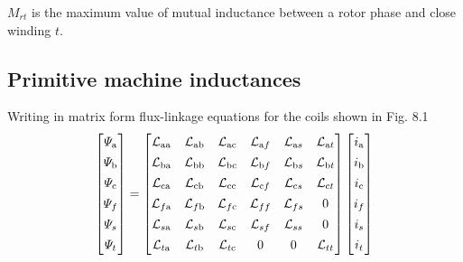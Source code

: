 \documentclass[a4paper,numbers=noenddot,12pt]{scrbook}
\begin{document}
$M_{rt}$ is the maximum value of mutual inductance between a rotor phase and close winding $t$.

\subsection{Primitive machine inductances} Writing in matrix form flux-linkage equations for the coils shown in Fig. 8.1
\begin{equation}
    \begin{bmatrix}
        \varPsi_{\textup{a}} \\[1ex] \varPsi_{\textup{b}} \\[1ex] \varPsi_{\textup{c}} \\[1ex] \varPsi_{f} \\[1ex] \varPsi_{s} \\[1ex] \varPsi_{t}
    \end{bmatrix}
    =
    \begin{bmatrix}

        \mathcal{L}_{\textup{aa}} & \mathcal{L}_{\textup{ab}} & \mathcal{L}_{\textup{ac}} & \mathcal{L}_{\textup{a}f} & \mathcal{L}_{\textup{a}s} & \mathcal{L}_{\textup{a}t} \\[1ex]  
        \mathcal{L}_{\textup{ba}} & \mathcal{L}_{\textup{bb}} & \mathcal{L}_{\textup{bc}} & \mathcal{L}_{\textup{b}f} & \mathcal{L}_{\textup{b}s} & \mathcal{L}_{\textup{b}t} \\[1ex]
        \mathcal{L}_{\textup{ca}} & \mathcal{L}_{\textup{cb}} & \mathcal{L}_{\textup{cc}} & \mathcal{L}_{\textup{c}f} & \mathcal{L}_{\textup{c}s} & \mathcal{L}_{\textup{c}t} \\[1ex]  
        \mathcal{L}_{f\textup{a}} & \mathcal{L}_{f\textup{b}} & \mathcal{L}_{f\textup{c}} & \mathcal{L}_{ff} & \mathcal{L}_{fs} & 0 \\[1ex]  
        \mathcal{L}_{s\textup{a}} & \mathcal{L}_{s\textup{b}} & \mathcal{L}_{s\textup{c}} & \mathcal{L}_{sf} & \mathcal{L}_{ss} & 0 \\[1ex]  
        \mathcal{L}_{t\textup{a}} & \mathcal{L}_{t\textup{b}} & \mathcal{L}_{t\textup{c}} & 0 & 0 & \mathcal{L}_{tt} 
    \end{bmatrix}
    \begin{bmatrix}
        i_{\textup{a}} \\[1ex] i_{\textup{b}} \\[1ex] i_{\textup{c}} \\[1ex] i_{f} \\[1ex] i_{s} \\[1ex] i_{t}
    \end{bmatrix}
    \label{eq:Eq8.20}
\end{equation} %
\end{document}
